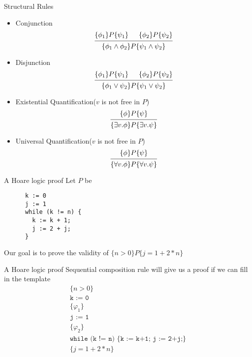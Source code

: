 \documentclass[presentation]{beamer}
\begin{document}
\begin{frame}[label={sec:org4170b63}]{Structural Rules}
\begin{itemize}
\item Conjunction
\begin{equation*}
\begin{prooftree}%
\hypo{\{\phi_1\}P\{\psi_1\}}
\hypo{\{\phi_2\}P\{\psi_2\}}
\infer2{\{\phi_1\wedge\phi_2\}P\{\psi_1\wedge\psi_2\}}
\end{prooftree}
\end{equation*}
\item Disjunction
\begin{equation*}
\begin{prooftree}%
\hypo{\{\phi_1\}P\{\psi_1\}}
\hypo{\{\phi_2\}P\{\psi_2\}}
\infer2{\{\phi_1\vee\psi_2\}P\{\psi_1\vee\psi_2\}}
\end{prooftree}
\end{equation*}
\item Existential Quantification(\(v\) is not free in \(P\))
\begin{equation*}
\begin{prooftree}%
\hypo{\{\phi\}P\{\psi\}}
\infer1{\{\exists v.\phi\}P\{\exists v.\psi\}}
\end{prooftree}
\end{equation*}
\item Universal Quantification(\(v\) is not free in \(P\))
\begin{equation*}
\begin{prooftree}%
\hypo{\{\phi\}P\{\psi\}}
\infer1{\{\forall v.\phi\}P\{\forall v.\psi\}}
\end{prooftree}
\end{equation*}
\end{itemize}
\end{frame}
\begin{frame}[label={sec:org2c35c53},fragile]{A Hoare logic proof}
 Let \(P\) be
\begin{verbatim}
      k := 0
      j := 1
      while (k != n) {
        k := k + 1;
        j := 2 + j;
      }
\end{verbatim}

Our goal is to prove the validity of \(\{n>0\}P\{j=1+2*n\}\)
\end{frame}
\begin{frame}[label={sec:org5373e90}]{A Hoare logic proof}
Sequential composition rule will give us a proof if we can fill in the template
\begin{gather*}
\{n>0\}\\
\texttt{k := 0}\\
\{\varphi_1\}\\
\texttt{j := 1}\\
\{\varphi_2\}\\
\texttt{while (k != n) \{k := k+1; j := 2+j;\}}\\
\{j=1+2*n\}
\end{gather*}
\end{frame}
\end{document}
